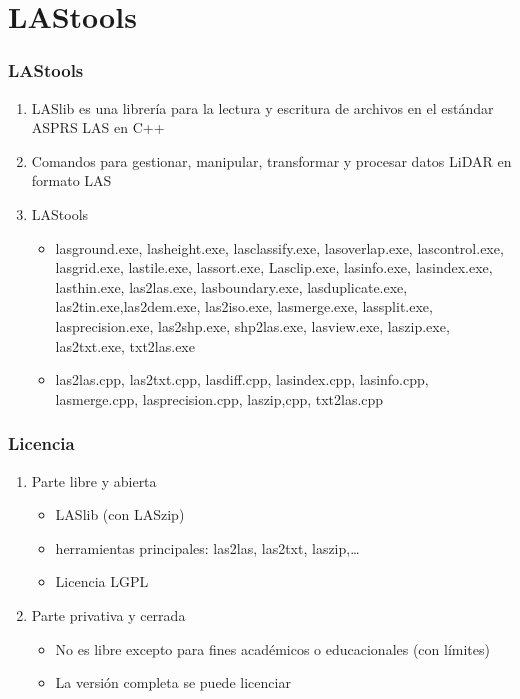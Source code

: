 \section{LAStools}
\begin{frame}
  \frametitle{LAStools}
  \begin{enumerate}
    \item LASlib es una librería para la \alert{lectura} y \alert{escritura} de archivos en el
      estándar ASPRS LAS en C++
    \item Comandos para gestionar, manipular, transformar y procesar datos LiDAR
      en formato LAS
    \item \alert{LAStools}
      \begin{itemize}
        \item lasground.exe, lasheight.exe, lasclassify.exe, lasoverlap.exe,
          lascontrol.exe, lasgrid.exe, lastile.exe, lassort.exe, Lasclip.exe,
          lasinfo.exe, lasindex.exe, lasthin.exe, las2las.exe, lasboundary.exe,
          lasduplicate.exe, las2tin.exe,las2dem.exe, las2iso.exe, lasmerge.exe,
          lassplit.exe, lasprecision.exe, las2shp.exe, shp2las.exe, lasview.exe,
          laszip.exe, las2txt.exe, txt2las.exe
        \item las2las.cpp, las2txt.cpp, lasdiff.cpp, lasindex.cpp, lasinfo.cpp,
          lasmerge.cpp, lasprecision.cpp, laszip,cpp, txt2las.cpp
      \end{itemize}
  \end{enumerate}
\end{frame}
\begin{frame}
  \frametitle{Licencia}
  \begin{enumerate}
    \item Parte libre y abierta
      \begin{itemize}
        \item LASlib (con LASzip)
        \item herramientas principales: las2las, las2txt, laszip,\ldots
        \item Licencia \alert{LGPL}
      \end{itemize}
    \item Parte privativa y cerrada
      \begin{itemize}
        \item No es libre excepto para fines académicos o educacionales (con
          límites)
        \item La versión completa se puede licenciar
      \end{itemize}
  \end{enumerate}
\end{frame}
